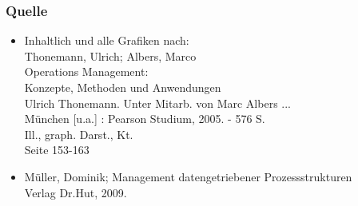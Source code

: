 \documentclass[xcolor=dvipsnames]{beamer}
\begin{document}
 \begin{frame}
  \frametitle{Quelle}
   \begin{itemize}
    \item Inhaltlich und alle Grafiken nach:\\
      Thonemann, Ulrich; Albers, Marco\\
      Operations Management:\\
      Konzepte, Methoden und Anwendungen\\
      Ulrich Thonemann. Unter Mitarb. von Marc Albers ... \\
      München [u.a.] : Pearson Studium, 2005. - 576 S.\\
      Ill., graph. Darst., Kt.\\
      Seite 153-163
     \item Müller, Dominik; Management datengetriebener Prozessstrukturen\\
      Verlag Dr.Hut, 2009.
   \end{itemize}
 \end{frame}
\end{document}
